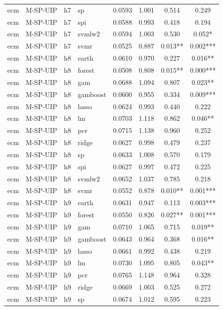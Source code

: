 \begin{ThreePartTable}
\begin{longtable}[t]{llclcccc}
ecm & M-SP-UIP & h7 & sp & 0.0593 & 1.001 & 0.514 & 0.249\\
ecm & M-SP-UIP & h7 & spi & 0.0588 & 0.993 & 0.418 & 0.194\\
ecm & M-SP-UIP & h7 & svmlw2 & 0.0594 & 1.003 & 0.530 & 0.052*\\
ecm & M-SP-UIP & h7 & svmr & 0.0525 & 0.887 & 0.013** & 0.002***\\
\addlinespace
ecm & M-SP-UIP & h8 & earth & 0.0610 & 0.970 & 0.227 & 0.016**\\
ecm & M-SP-UIP & h8 & forest & 0.0508 & 0.808 & 0.015** & 0.000***\\
ecm & M-SP-UIP & h8 & gam & 0.0688 & 1.094 & 0.807 & 0.023**\\
ecm & M-SP-UIP & h8 & gamboost & 0.0600 & 0.955 & 0.334 & 0.009***\\
ecm & M-SP-UIP & h8 & lasso & 0.0624 & 0.993 & 0.440 & 0.222\\
ecm & M-SP-UIP & h8 & lm & 0.0703 & 1.118 & 0.862 & 0.046**\\
ecm & M-SP-UIP & h8 & pcr & 0.0715 & 1.138 & 0.960 & 0.252\\
ecm & M-SP-UIP & h8 & ridge & 0.0627 & 0.998 & 0.479 & 0.237\\
ecm & M-SP-UIP & h8 & sp & 0.0633 & 1.008 & 0.570 & 0.179\\
ecm & M-SP-UIP & h8 & spi & 0.0627 & 0.997 & 0.472 & 0.225\\
ecm & M-SP-UIP & h8 & svmlw2 & 0.0652 & 1.037 & 0.785 & 0.218\\
ecm & M-SP-UIP & h8 & svmr & 0.0552 & 0.878 & 0.010** & 0.001***\\
\addlinespace
ecm & M-SP-UIP & h9 & earth & 0.0631 & 0.947 & 0.113 & 0.003***\\
ecm & M-SP-UIP & h9 & forest & 0.0550 & 0.826 & 0.027** & 0.001***\\
ecm & M-SP-UIP & h9 & gam & 0.0710 & 1.065 & 0.715 & 0.019**\\
ecm & M-SP-UIP & h9 & gamboost & 0.0643 & 0.964 & 0.368 & 0.016**\\
ecm & M-SP-UIP & h9 & lasso & 0.0661 & 0.992 & 0.438 & 0.219\\
ecm & M-SP-UIP & h9 & lm & 0.0730 & 1.095 & 0.805 & 0.043**\\
ecm & M-SP-UIP & h9 & pcr & 0.0765 & 1.148 & 0.964 & 0.328\\
ecm & M-SP-UIP & h9 & ridge & 0.0669 & 1.003 & 0.525 & 0.272\\
ecm & M-SP-UIP & h9 & sp & 0.0674 & 1.012 & 0.595 & 0.223\\

\end{longtable}
\end{ThreePartTable}
